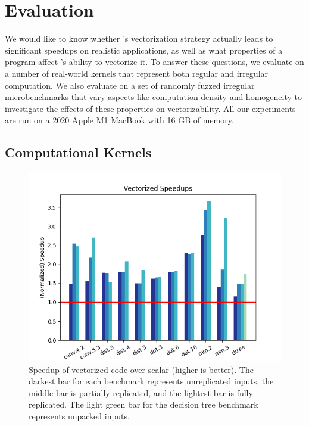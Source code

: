 \section{Evaluation}\label{sec:eval}


We would like to know whether \system's vectorization strategy actually leads to significant speedups on realistic applications, as well as what properties of a program affect \system's ability to vectorize it.
To answer these questions, we evaluate \system on a number of real-world kernels that represent both regular and irregular computation.
We also evaluate \system on a set of randomly fuzzed irregular microbenchmarks that vary aspects like computation density and homogeneity to investigate the effects of these properties on vectorizability. %
All our experiments are run on a 2020 Apple M1 MacBook with 16 GB of memory. %

\subsection{Computational Kernels}
\begin{figure}
    \includegraphics[width=0.7\linewidth]{figures/graphs/vector_speedups.png}
    \caption{Speedup of vectorized code over scalar (higher is better). The darkest bar for each benchmark represents unreplicated inputs, the middle bar is partially replicated, and the lightest bar is fully replicated. The light green bar for the decision tree benchmark represents unpacked inputs.}\label{fig:vector-speedups}
\end{figure}

